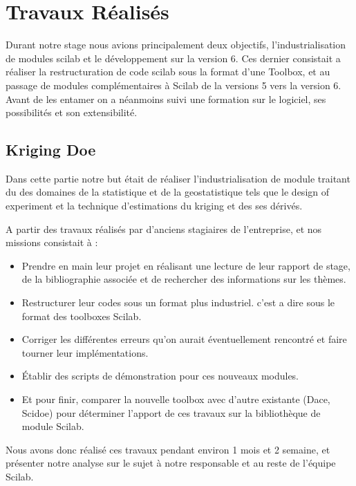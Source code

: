 \section*{Travaux Réalisés}

Durant notre stage nous avions principalement deux objectifs,
l’industrialisation de modules scilab et le développement sur
la version 6.
Ces dernier consistait a réaliser la restructuration de code scilab sous
la format d’une Toolbox, et au passage de modules complémentaires
à Scilab de la versions 5 vers la version 6.
Avant de les entamer on a néanmoins suivi une formation sur le logiciel,
ses possibilités et son extensibilité.

\subsection*{Kriging Doe}

Dans cette partie notre but était de réaliser l’industrialisation
de module traitant du des domaines de la statistique et de la
geostatistique tels que le design of experiment et la technique
d’estimations du kriging et des ses dérivés.

A partir des travaux réalisés par d’anciens stagiaires de l’entreprise,
et nos missions consistait à :

\begin{itemize}
    \item Prendre en main leur projet en réalisant une lecture
        de leur rapport de stage, de la bibliographie associée
        et de rechercher des informations sur les thèmes.
    \item Restructurer leur codes sous un format plus industriel.
        c’est a dire sous le format des toolboxes Scilab.
    \item Corriger les différentes erreurs qu’on aurait
        éventuellement rencontré et faire tourner leur implémentations.
    \item Établir des scripts de démonstration pour ces nouveaux modules.
    \item Et pour finir, comparer la nouvelle toolbox avec d’autre
        existante (Dace, Scidoe) pour déterminer l’apport de ces
        travaux sur la bibliothèque de module Scilab.
\end{itemize}

Nous avons donc réalisé ces travaux pendant environ 1 mois et 2 semaine,
et présenter notre analyse sur le sujet à notre responsable
et au reste de l’équipe Scilab.

